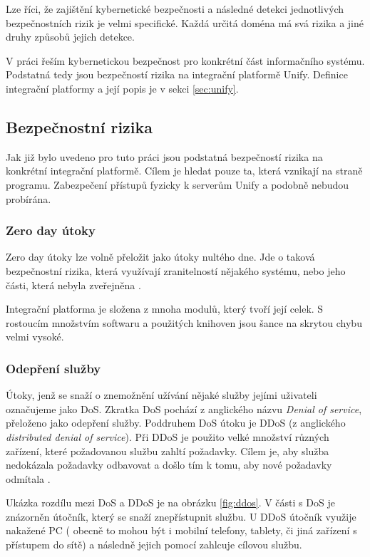 \documentclass[thesis=M,czech]{FITthesis}[2012/10/20]
\begin{document}
		Lze říci, že zajištění kybernetické bezpečnosti a následné detekci jednotlivých bezpečnostních rizik je velmi specifické. Každá určitá doména má svá rizika a jiné druhy způsobů jejich detekce. 
		
		V práci řeším kybernetickou bezpečnost pro konkrétní část informačního systému. Podstatná tedy jsou bezpečností rizika na integrační platformě Unify. Definice integrační platformy a její popis je v sekci \ref{sec:unify}.
		
		\subsection{Bezpečnostní rizika}
			Jak již bylo uvedeno pro tuto práci jsou podstatná bezpečností rizika na konkrétní integrační platformě. Cílem je hledat pouze ta, která vznikají na straně programu. Zabezpečení přístupů fyzicky k serverům Unify a podobně nebudou probírána.
			
			\subsubsection{Zero day útoky}
				\label{sec:zero-day}
				Zero day útoky lze volně přeložit jako útoky nultého dne.
				Jde o taková bezpečnostní rizika, která využívají zranitelností nějakého systému, nebo jeho části, která nebyla zveřejněna \cite{investigationZ0}.
				
				Integrační platforma je složena z mnoha modulů, který tvoří její celek. S rostoucím množstvím softwaru a použitých knihoven jsou šance na skrytou chybu velmi vysoké. 
			
			\subsubsection{Odepření služby}
				Útoky, jenž se snaží o znemožnění užívání nějaké služby jejími uživateli označujeme jako DoS. Zkratka DoS pochází z anglického názvu \textit{Denial of service}, přeloženo jako odepření služby. Poddruhem DoS útoku je DDoS (z anglického \textit{distributed denial of service}). Při DDoS je použito velké množství různých zařízení, které požadovanou službu zahltí požadavky. Cílem je, aby služba nedokázala požadavky odbavovat a došlo tím k tomu, aby nové požadavky odmítala \cite{dosAndDdos}.
				
				Ukázka rozdílu mezi DoS a DDoS je na obrázku \ref{fig:ddos}. V části s DoS je znázorněn útočník, který se snaží znepřístupnit službu. U DDoS útočník využije nakažené PC ( obecně to mohou být i mobilní telefony, tablety, či jiná zařízení s přístupem do sítě) a následně jejich pomocí zahlcuje cílovou službu.	
				
\end{document}
